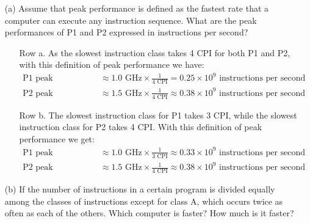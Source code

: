 \documentclass[12pt]{article}
\begin{document}
\begin{itemize}
\item[(a)] Assume that peak performance is defined as the fastest rate that a computer can execute any instruction sequence. What are the peak performances of P1 and P2 expressed in instructions per second?
\begin{itemize}
\item[Row a.] As the slowest instruction class takes 4 CPI for both P1 and P2, with this definition of peak performance we have:
\begin{align*}
\text{P1 peak performance} &\approx 1.0\text{ GHz} \times \frac{1}{4\text{ CPI}} = \boxed{0.25 \times 10^9\text{ instructions per second}} \\
\text{P2 peak performance} &\approx 1.5\text{ GHz} \times \frac{1}{4\text{ CPI}} \approx \boxed{0.38 \times 10^9\text{ instructions per second}}
\end{align*}
\item[Row b.] The slowest instruction class for P1 takes 3 CPI, while the slowest instruction class for P2 takes 4 CPI. With this definition of peak performance we get:
\begin{align*}
\text{P1 peak performance} &\approx 1.0\text{ GHz} \times \frac{1}{3\text{ CPI}} \approx \boxed{0.33 \times 10^9\text{ instructions per second}} \\
\text{P2 peak performance} &\approx 1.5\text{ GHz} \times \frac{1}{4\text{ CPI}} \approx \boxed{0.38 \times 10^9\text{ instructions per second}}
\end{align*}
\end{itemize}
\item[(b)] If the number of instructions in a certain program is divided equally among the classes of instructions except for class A, which occurs twice as often as each of the others. Which computer is faster? How much is it faster?

\end{itemize}
\end{document}
